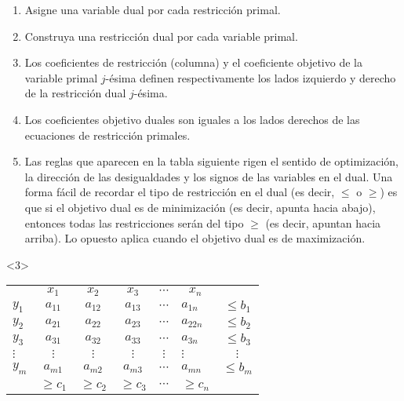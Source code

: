 \begin{frame}{}{}
  
  \begin{enumerate} \justifying \parskip4mm
\item<only@1> Asigne una variable dual por cada restricción primal.
\item<only@1> Construya una restricción dual por cada variable primal.
\item<only@1> Los coeficientes de restricción (columna) y el coeficiente objetivo de la variable
primal $j$-ésima definen respectivamente los lados izquierdo y derecho de la restricción dual $j$-ésima.
\item<only@2>  Los coeficientes objetivo duales son iguales a los lados derechos de las ecuaciones de restricción primales.
\item<only@2> Las reglas que aparecen en la tabla siguiente rigen el sentido de optimización, la dirección de las desigualdades y los signos de las variables en el dual. Una forma fácil
de recordar el tipo de restricción en el dual (es decir, $\leq$ o $\geq$) es que si el objetivo
dual es de \alert{minimización} (es decir, apunta hacia abajo), entonces todas las restricciones serán del tipo $\geq$ (es decir, apuntan hacia arriba). Lo opuesto aplica cuando el objetivo dual es de \alert{maximización}.
\end{enumerate}

\begin{onlyenv}<3>
  {\centering
\begin{tabular}{ccccccc}
 & $x_1$ & $x_2$ & $x_3$ & $\cdots $ & $x_n$ &  \\\cline{2-6}
\multicolumn{1}{l|}{$y_1$} & $a_{11}$ & $a_{12}$ & $a_{13}$ & $\cdots$ & \multicolumn{1}{l|}{$a_{1n}$} & $\leq b_1$ \\
\multicolumn{1}{l|}{$y_2$} & $a_{21}$ & $a_{22}$ & $a_{23}$ & $\cdots$ & \multicolumn{1}{l|}{$a_{22n}$} & $\leq b_2$ \\
\multicolumn{1}{l|}{$y_3$} & $a_{31}$ & $a_{32}$ & $a_{33}$ & $\cdots$ & \multicolumn{1}{l|}{$a_{3n}$} & $\leq b_3$ \\
\multicolumn{1}{l|}{$\vdots$} & $\vdots$ & $\vdots$ & $\vdots$ & $\vdots$ & \multicolumn{1}{l|}{$\vdots$} & $\vdots$ \\
\multicolumn{1}{l|}{$y_m$} & $a_{m1}$ & $a_{m2}$ & $a_{m3}$ & $\cdots$ & \multicolumn{1}{l|}{$a_{mn}$} & $\leq b_m$ \\ \cline{2-6}
 & $\geq c_1$ & $\geq c_2$ & $\geq c_3$ & $\cdots$ & $\geq c_n$ & 
\end{tabular}
  \par}
\end{onlyenv}
\end{frame}

